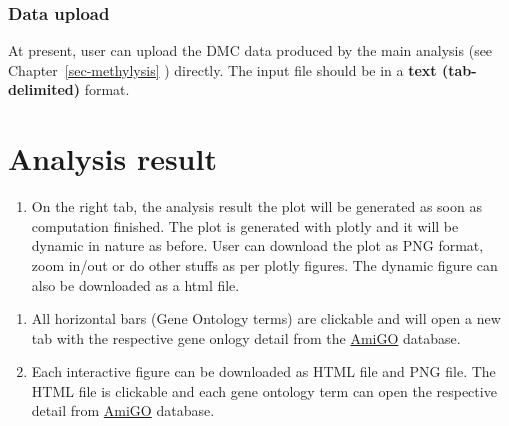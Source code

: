 \documentclass[
  a4paper,
  DIV=11,
  numbers=noendperiod,
  oneside,
  open=any]{scrreport}
\providecommand{\tightlist}{%
  \setlength{\itemsep}{0pt}\setlength{\parskip}{0pt}}\usepackage{longtable,booktabs,array}
\begin{document}
\subsubsection{Data upload}\label{data-upload-4}

At present, user can upload the DMC data produced by the main analysis
(see Chapter~\ref{sec-methylysis} ) directly. The input file should be
in a \textbf{text (tab-delimited)} format.

\section{Analysis result}\label{analysis-result-4}

\begin{enumerate}
\def\labelenumi{\arabic{enumi}.}
\tightlist
\item
  On the right tab, the analysis result the plot will be generated as
  soon as computation finished. The plot is generated with plotly and it
  will be dynamic in nature as before. User can download the plot as PNG
  format, zoom in/out or do other stuffs as per plotly figures. The
  dynamic figure can also be downloaded as a html file.
\end{enumerate}

\begin{tcolorbox}[enhanced jigsaw, breakable, colback=white, colbacktitle=quarto-callout-note-color!10!white, opacityback=0, left=2mm, bottomrule=.15mm, opacitybacktitle=0.6, coltitle=black, bottomtitle=1mm, toprule=.15mm, toptitle=1mm, arc=.35mm, titlerule=0mm, rightrule=.15mm, title=\textcolor{quarto-callout-note-color}{\faInfo}\hspace{0.5em}{Note}, colframe=quarto-callout-note-color-frame, leftrule=.75mm]

\begin{enumerate}
\def\labelenumi{\arabic{enumi}.}
\tightlist
\item
  All horizontal bars (Gene Ontology terms) are clickable and will open
  a new tab with the respective gene onlogy detail from the
  \href{http://amigo.geneontology.org/amigo}{AmiGO} database.
\item
  Each interactive figure can be downloaded as HTML file and PNG file.
  The HTML file is clickable and each gene ontology term can open the
  respective detail from
  \href{http://amigo.geneontology.org/amigo}{AmiGO} database.
\end{enumerate}

\end{tcolorbox}
\end{document}
